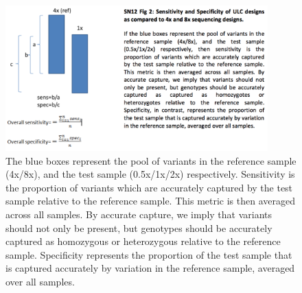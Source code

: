 \begin{figure}
\centering
\includegraphics[trim={0 0 0cm 0},clip,width=0.9\textwidth]{fig/SN12f2}
\caption[Sensitivity and specificity as compared between higher and lower coverage sequence data.]{The blue boxes represent the pool of variants in the reference sample (4x/8x), and the test sample (0.5x/1x/2x) respectively. Sensitivity is the proportion of variants which are accurately captured by the test sample relative to the reference sample. This metric is then averaged across all samples. By accurate capture, we imply that variants should not only be present, but genotypes should be accurately captured as homozygous or heterozygous relative to the reference sample. Specificity represents the proportion of the test sample that is captured accurately by variation in the reference sample, averaged over all samples.}
\label{fig:SN12f2}
\end{figure}